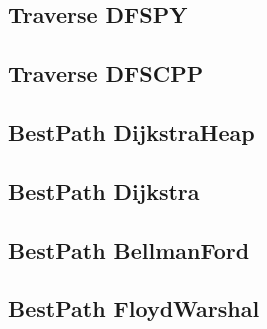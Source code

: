 \subsection{Traverse DFSPY}
\raggedbottom
\hrulefill
\subsection{Traverse DFSCPP}
\raggedbottom
\hrulefill
\subsection{BestPath DijkstraHeap}
\raggedbottom
\hrulefill
\subsection{BestPath Dijkstra}
\raggedbottom
\hrulefill
\subsection{BestPath BellmanFord}
\raggedbottom
\hrulefill
\subsection{BestPath FloydWarshal}
\raggedbottom
\hrulefill

